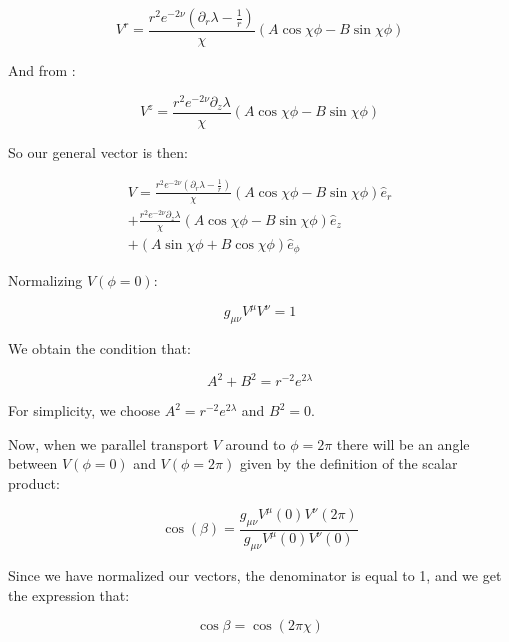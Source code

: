 \documentclass[12pt]{article}
\begin{document}
\begin{appendices}
\begin{equation}
V^{r}=\frac{r^2e^{-2\nu}(\partial_r\lambda-\frac{1}{r})}{\chi}\left(A\cos\chi\phi-B\sin\chi\phi\right)
\end{equation}

And from :

\begin{equation}
V^{z}=\frac{r^2 e^{-2\nu}\partial_z\lambda}{\chi}\left(A\cos\chi\phi-B\sin\chi\phi\right)
\end{equation}

So our general vector is then:

\begin{equation}
\label{eq:V-from-par-transport}
\begin{split}
V=\frac{r^2e^{-2\nu}(\partial_r\lambda-\frac{1}{r})}{\chi}\left(A\cos\chi\phi-B\sin\chi\phi\right)\hat{e}_{r} \\
+\frac{r^2 e^{-2\nu}\partial_z\lambda}{\chi}\left(A\cos\chi\phi-B\sin\chi\phi\right)\hat{e}_{z} \\
+\left(A\sin\chi\phi+B\cos\chi\phi\right)\hat{e}_{\phi}
\end{split}
\end{equation}

Normalizing $V(\phi=0)$:

\begin{equation}
\label{eq:inner-product}
g_{\mu\nu}V^{\mu}V^{\nu}=1
\end{equation}

We obtain the condition that:

\begin{equation}
A^2+B^2=r^{-2}e^{2\lambda}
\end{equation}

For simplicity, we choose $A^2=r^{-2}e^{2\lambda}$ and $B^2=0$.

Now, when we parallel transport $V$ around to $\phi=2\pi$ there will be an angle between $V(\phi=0)$ and $V(\phi=2\pi)$ given by the definition of the scalar product:

\begin{equation}
\cos(\beta)=\frac{g_{\mu\nu}V^{\mu}(0)V^{\nu}(2\pi)}{g_{\mu\nu}V^{\mu}(0)V^{\nu}(0)}
\end{equation}

Since we have normalized our vectors, the denominator is equal to 1, and we get the expression that:

\begin{equation}
\cos\beta=\cos(2\pi\chi)
\end{equation}


\end{appendices}
\end{document}
